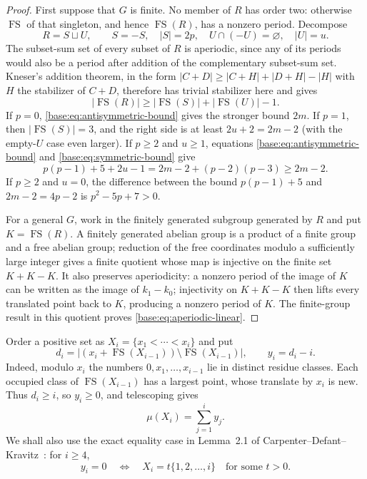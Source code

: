 \documentclass[11pt,a4paper]{article}
\theoremstyle{remark}
\newcommand{\FS}{\operatorname{FS}}
\newcommand{\card}[1]{\lvert #1\rvert}
\begin{document}
\begin{proof}
First suppose that $G$ is finite.  No member of $R$ has order two: otherwise
$\FS$ of that singleton, and hence $\FS(R)$, has a nonzero period.  Decompose
\[
 R=S\sqcup U,\qquad S=-S,\quad \card S=2p,\quad
 U\cap(-U)=\varnothing,\quad \card U=u.
\]
The subset-sum set of every subset of $R$ is aperiodic, since any of its
periods would also be a period after addition of the complementary
subset-sum set.  Kneser's addition theorem, in the form
$|C+D|\ge|C+H|+|D+H|-|H|$ with $H$ the stabilizer of $C+D$,
therefore has trivial stabilizer here and
gives
\[
 \card{\FS(R)}\geq\card{\FS(S)}+\card{\FS(U)}-1.
\]
If $p=0$, \eqref{base:eq:antisymmetric-bound} gives the stronger bound $2m$.
If $p=1$, then $\card{\FS(S)}=3$, and the right side is at least
$2u+2=2m-2$ (with the empty-$U$ case even larger).  If $p\geq2$ and
$u\geq1$, equations \eqref{base:eq:antisymmetric-bound} and
\eqref{base:eq:symmetric-bound} give
\[
 p(p-1)+5+2u-1
 =2m-2+(p-2)(p-3)\geq2m-2.
\]
If $p\geq2$ and $u=0$, the difference between the bound
$p(p-1)+5$ and $2m-2=4p-2$ is $p^2-5p+7>0$.

For a general $G$, work in the finitely generated subgroup generated by
$R$ and put $K=\FS(R)$. A finitely generated abelian group is a product
of a finite group and a free abelian group; reduction of the free coordinates
modulo a sufficiently large integer gives a finite quotient whose map is
injective on the finite set $K+K-K$.  It also preserves aperiodicity: a nonzero period
of the image of $K$ can be written as the image of $k_1-k_0$; injectivity on
$K+K-K$ then lifts every translated point back to $K$, producing a nonzero
period of $K$.  The finite-group result in this quotient proves
\eqref{base:eq:aperiodic-linear}.
\end{proof}

Order a positive set as $X_i=\{x_1<\cdots<x_i\}$ and put
\[
 d_i=\card{(x_i+\FS(X_{i-1}))\setminus\FS(X_{i-1})},
 \qquad y_i=d_i-i.
\]
Indeed, modulo $x_i$ the numbers $0,x_1,\ldots,x_{i-1}$ lie
in distinct residue classes. Each occupied class of $\FS(X_{i-1})$
has a largest point, whose translate by $x_i$ is new. Thus $d_i\ge i$,
so $y_i\ge0$, and telescoping gives
\begin{equation}
 \mu(X_i)=\sum_{j=1}^i y_j.
 \label{base:eq:increment-sum}
\end{equation}
We shall also use the exact equality case in Lemma~2.1 of
Carpenter--Defant--Kravitz~\cite{CDK2026}: for $i\geq4$,
\begin{equation}
 y_i=0\quad\Longleftrightarrow\quad
 X_i=t\{1,2,\ldots,i\}\quad\text{for some }t>0.
 \label{base:eq:zero-increment}
\end{equation}
\end{document}

